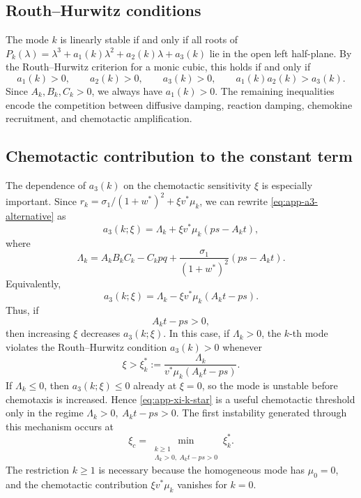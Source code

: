 \documentclass[a4paper,fleqn,longmktitle]{cas-sc}
\theoremstyle{plain}
\theoremstyle{definition}
\numberwithin{equation}{section}
\begin{document}
\subsection{Routh--Hurwitz conditions}
\label{app:rh-conditions}
The mode \(k\) is linearly stable if and only if all roots of
\(P_k(\lambda)=\lambda^3+a_1(k)\lambda^2+a_2(k)\lambda+a_3(k)\) lie in the open
left half-plane. By the Routh--Hurwitz criterion for a monic cubic, this holds if
and only if
\begin{equation}\label{eq:app-rh-conditions}
a_1(k)>0,\qquad
a_2(k)>0,\qquad
a_3(k)>0,\qquad
a_1(k)a_2(k)>a_3(k).
\end{equation}
Since \(A_k,B_k,C_k>0\), we always have \(a_1(k)>0\). The remaining inequalities
encode the competition between diffusive damping, reaction damping, chemokine
recruitment, and chemotactic amplification.

\subsection{Chemotactic contribution to the constant term}
\label{app:rh-chemotaxis-constant-term}
The dependence of \(a_3(k)\) on the chemotactic sensitivity \(\xi\) is especially
important. Since \(r_k=\sigma_1/(1+w^*)^2+\xi v^*\mu_k\), we can rewrite
\eqref{eq:app-a3-alternative} as
\begin{equation}\label{eq:app-a3-xi}
a_3(k;\xi)
=
\Lambda_k+\xi v^*\mu_k(ps-A_kt),
\end{equation}
where
\begin{equation}\label{eq:app-Lambda-k}
\Lambda_k
=
A_kB_kC_k-C_kpq
+
\frac{\sigma_1}{(1+w^*)^2}(ps-A_kt).
\end{equation}
Equivalently,
\begin{equation}\label{eq:app-a3-xi-negative-form}
a_3(k;\xi)
=
\Lambda_k-\xi v^*\mu_k(A_kt-ps).
\end{equation}
Thus, if
\begin{equation}\label{eq:app-destabilizing-condition}
A_kt-ps>0,
\end{equation}
then increasing \(\xi\) decreases \(a_3(k;\xi)\). In this case, if
\(\Lambda_k>0\), the \(k\)-th mode violates the Routh--Hurwitz condition
\(a_3(k)>0\) whenever
\begin{equation}\label{eq:app-xi-k-star}
\xi>\xi_k^*
:=
\frac{\Lambda_k}{v^*\mu_k(A_kt-ps)} .
\end{equation}
If \(\Lambda_k\le0\), then \(a_3(k;\xi)\le0\) already at \(\xi=0\), so the mode
is unstable before chemotaxis is increased. Hence \eqref{eq:app-xi-k-star} is a
useful chemotactic threshold only in the regime \(\Lambda_k>0,\ A_kt-ps>0\). The
first instability generated through this mechanism occurs at
\begin{equation}\label{eq:app-xi-critical}
\xi_c
=
\min_{\substack{k\ge1\\ \Lambda_k>0,\ A_kt-ps>0}}
\xi_k^* .
\end{equation}
The restriction \(k\ge1\) is necessary because the homogeneous mode has
\(\mu_0=0\), and the chemotactic contribution \(\xi v^*\mu_k\) vanishes for
\(k=0\).
\end{document}
